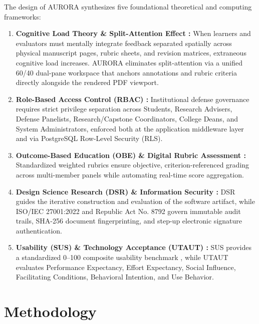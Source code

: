 \documentclass[sigplan,screen,nonacm]{acmart}
\begin{document}
The design of AURORA synthesizes five foundational theoretical and computing frameworks:
\begin{enumerate}
  \item \textbf{Cognitive Load Theory \& Split-Attention Effect \cite{sweller1988cognitive}:} When learners and evaluators must mentally integrate feedback separated spatially across physical manuscript pages, rubric sheets, and revision matrices, extraneous cognitive load increases. AURORA eliminates split-attention via a unified 60/40 dual-pane workspace that anchors annotations and rubric criteria directly alongside the rendered PDF viewport.
  \item \textbf{Role-Based Access Control (RBAC) \cite{ferraiolo1992role}:} Institutional defense governance requires strict privilege separation across Students, Research Advisers, Defense Panelists, Research/Capstone Coordinators, College Deans, and System Administrators, enforced both at the application middleware layer and via PostgreSQL Row-Level Security (RLS).
  \item \textbf{Outcome-Based Education (OBE) \& Digital Rubric Assessment \cite{spady1994outcome, erradi2012automated, chio2022thesist}:} Standardized weighted rubrics ensure objective, criterion-referenced grading across multi-member panels while automating real-time score aggregation.
  \item \textbf{Design Science Research (DSR) \& Information Security \cite{hevner2004design, iso27001, ra8792}:} DSR guides the iterative construction and evaluation of the software artifact, while ISO/IEC 27001:2022 and Republic Act No. 8792 govern immutable audit trails, SHA-256 document fingerprinting, and step-up electronic signature authentication.
  \item \textbf{Usability (SUS) \& Technology Acceptance (UTAUT) \cite{brooke1996sus, venkatesh2003user}:} SUS provides a standardized 0--100 composite usability benchmark \cite{bangor2009determining}, while UTAUT evaluates Performance Expectancy, Effort Expectancy, Social Influence, Facilitating Conditions, Behavioral Intention, and Use Behavior.
\end{enumerate}

\section{Methodology}
\end{document}
